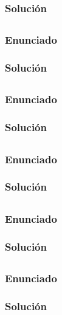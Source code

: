 \subsubsection{Solución}

\subsection{}\label{ej1-1-58}

\subsubsection{Enunciado}

\subsubsection{Solución}

\subsection{}\label{ej1-1-59}

\subsubsection{Enunciado}

\subsubsection{Solución}

\subsection{}\label{ej1-1-60}

\subsubsection{Enunciado}

\subsubsection{Solución}

\subsection{}\label{ej1-1-61}

\subsubsection{Enunciado}

\subsubsection{Solución}

\subsection{}\label{ej1-1-62}

\subsubsection{Enunciado}

\subsubsection{Solución}

